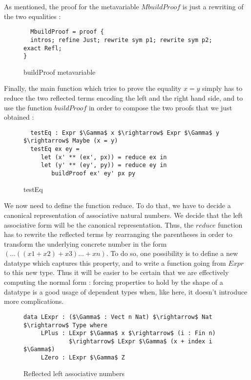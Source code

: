 As mentioned, the proof for the metavariable $MbuildProof$ is just a rewriting of the two equalities :

\begin{figure}[H]
\figrule
\begin{center}
\begin{lstlisting}
  MbuildProof = proof {
  intros; refine Just; rewrite sym p1; rewrite sym p2; exact Refl;
}  
\end{lstlisting}
\end{center}
\caption{buildProof metavariable}
\label{MbuildProof}
\figrule
\end{figure}

Finally, the main function which tries to prove the equality $x=y$ simply has to reduce the two reflected terms encoding the left and the right hand side, and to use the function $buildProof$ in order to compose the two proofs that we just obtained :

\begin{figure}[H]
\figrule
\begin{center}
\begin{lstlisting}
  testEq : Expr $\Gamma$ x $\rightarrow$ Expr $\Gamma$ y $\rightarrow$ Maybe (x = y)
  testEq ex ey = 
     let (x' ** (ex', px)) = reduce ex in 
     let (y' ** (ey', py)) = reduce ey in
        buildProof ex' ey' px py 
\end{lstlisting}
\end{center}
\caption{testEq}
\label{testEq}
\figrule
\end{figure}

We now need to define the function reduce. To do that, we have to decide a canonical representation of associative natural numbers. We decide that the left associative form will be the canonical representation. Thus, the $reduce$ function has to rewrite the reflected terms by rearranging the parentheses in order to transform the underlying concrete number in the form $(...((x1 + x2) + x3) ... + xn)$. To do so, one possibility is to define a new datatype which captures this property, and to write a function going from $Expr$ to this new type. Thus it will be easier to be certain that we are effectively computing the normal form : forcing properties to hold by the shape of a datatype is a good usage of dependent types when, like here, it doesn't introduce more complications.

\begin{figure}[H]
\figrule
\begin{center}
\begin{lstlisting}
data LExpr : ($\Gamma$ : Vect n Nat) $\rightarrow$ Nat $\rightarrow$ Type where
     LPlus : LExpr $\Gamma$ x $\rightarrow$ (i : Fin n) 
             $\rightarrow$ LExpr $\Gamma$ (x + index i $\Gamma$)
     LZero : LExpr $\Gamma$ Z
\end{lstlisting}
\end{center}
\caption{Reflected left associative numbers}
\label{LExpr}
\figrule
\end{figure}

